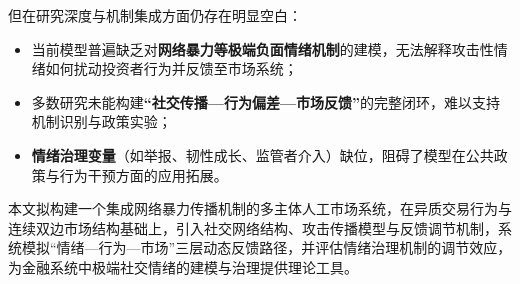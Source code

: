 但在研究深度与机制集成方面仍存在明显空白：

\begin{itemize}
  \item 当前模型普遍缺乏对\textbf{网络暴力等极端负面情绪机制}的建模，无法解释攻击性情绪如何扰动投资者行为并反馈至市场系统；
  \item 多数研究未能构建\textbf{“社交传播—行为偏差—市场反馈”}的完整闭环，难以支持机制识别与政策实验；
  \item \textbf{情绪治理变量}（如举报、韧性成长、监管者介入）缺位，阻碍了模型在公共政策与行为干预方面的应用拓展。
\end{itemize}

本文拟构建一个集成网络暴力传播机制的多主体人工市场系统，在异质交易行为与连续双边市场结构基础上，引入社交网络结构、攻击传播模型与反馈调节机制，系统模拟“情绪—行为—市场”三层动态反馈路径，并评估情绪治理机制的调节效应，为金融系统中极端社交情绪的建模与治理提供理论工具。
